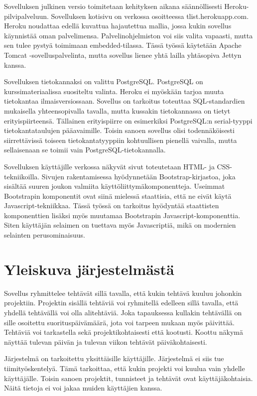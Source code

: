 \documentclass[12pt,a4paper,oneside,titlepage,pdftex]{article}
\begin{document}
Sovelluksen julkinen versio toimitetaan kehityksen aikana säännöllisesti Heroku\hyp{}pilvipalveluun. Sovelluksen kotisivu on verkossa osoitteessa tlist.herokuapp.com. Heroku noudattaa edellä kuvattua hajautettua mallia, jossa kukin sovellus käynnistää oman palvelimensa. Palvelinohjelmiston voi siis valita vapaasti, mutta sen tulee pystyä toimimaan embedded-tilassa. Tässä työssä käytetään Apache Tomcat -sovelluspalvelinta, mutta sovellus lienee yhtä lailla yhtäsopiva Jettyn kanssa.

Sovelluksen tietokannaksi on valittu PostgreSQL. PostgreSQL on kurssimateriaalissa suositeltu valinta. Heroku ei myöskään tarjoa muuta tietokantaa ilmaisversiossaan. Sovellus on tarkoitus toteuttaa SQL-standardien mukaisella yhteensopivalla tavalla, mutta kussakin tietokannassa on tietyt erityispiirteensä. Tällainen erityispiirre on esimerkiksi PostgreSQL:n serial-tyyppi tietokantataulujen pääavaimille. Toisin sanoen sovellus olisi todennäköisesti siirrettävissä toiseen tietokantatyyppiin kohtuullisen pienellä vaivalla, mutta sellaisenaan se toimii vain PostgreSQL-tietokannalla.

Sovelluksen käyttäjille verkossa näkyvät sivut toteutetaan HTML- ja CSS-tekniikoilla. Sivujen rakentamisessa hyödynnetään Bootstrap-kirjastoa, joka sisältää suuren joukon valmiita käyttöliittymäkomponentteja. Useimmat Bootstrapin komponentit ovat siinä mielessä staattisia, että ne eivät käytä Javascript-tekniikkaa. Tässä työssä on tarkoitus hyödyntää staattisten komponenttien lisäksi myös muutamaa Bootstrapin Javascript-komponenttia. Siten käyttäjän selaimen on tuettava myös Javascriptiä, mikä on modernien selainten perusominaisuus.

\section{Yleiskuva järjestelmästä}

Sovellus ryhmittelee tehtävät sillä tavalla, että kukin tehtävä kuuluu johonkin projektiin. Projektin sisällä tehtäviä voi ryhmitellä edelleen sillä tavalla, että yhdellä tehtävällä voi olla alitehtäviä. Joka tapauksessa kullakin tehtävällä on sille osoitettu suorituspäivämäärä, jota voi tarpeen mukaan myös päivittää. Tehtäviä voi tarkastella sekä projektikohtaisesti että kootusti. Koottu näkymä näyttää tulevan päivän ja tulevan viikon tehtävät päiväkohtaisesti.

Järjestelmä on tarkoitettu yksittäisille käyttäjille. Järjestelmä ei siis tue tiimityöskentelyä. Tämä tarkoittaa, että kukin projekti voi kuulua vain yhdelle käyttäjälle. Toisin sanoen projektit, tunnisteet ja tehtävät ovat käyttäjäkohtaisia. Näitä tietoja ei voi jakaa muiden käyttäjien kanssa.
\end{document}
